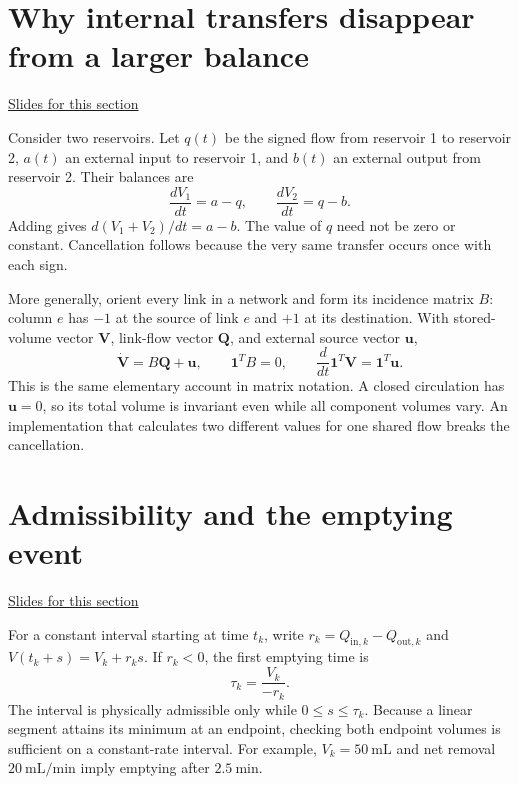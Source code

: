 \documentclass[11pt,letterpaper]{article}
\theoremstyle{definition}\newtheorem{definition}{Definition}\newtheorem{example}{Example}
\numberwithin{equation}{section}
\begin{document}
\section{Why internal transfers disappear from a larger balance}
\hypertarget{note-why-internal-transfers-disappear-from-a-larger-balance}{}\label{note:why-internal-transfers-disappear-from-a-larger-balance}
{\small \href{slides.html\#frame=enlarge-the-boundary\&step=1}{Slides for this section}}\par
Consider two reservoirs. Let $q(t)$ be the signed flow from reservoir 1 to reservoir 2, $a(t)$ an external input to reservoir 1, and $b(t)$ an external output from reservoir 2. Their balances are
\[
\frac{dV_1}{dt}=a-q,\qquad \frac{dV_2}{dt}=q-b.
\]
Adding gives $d(V_1+V_2)/dt=a-b$. The value of $q$ need not be zero or constant. Cancellation follows because the very same transfer occurs once with each sign.

More generally, orient every link in a network and form its incidence matrix $B$: column $e$ has $-1$ at the source of link $e$ and $+1$ at its destination. With stored-volume vector $\mathbf V$, link-flow vector $\mathbf Q$, and external source vector $\mathbf u$,
\[
\dot{\mathbf V}=B\mathbf Q+\mathbf u,
\qquad \mathbf1^{T}B=0,
\qquad
\frac{d}{dt}\mathbf1^{T}\mathbf V=\mathbf1^{T}\mathbf u.
\]
This is the same elementary account in matrix notation. A closed circulation has $\mathbf u=0$, so its total volume is invariant even while all component volumes vary. An implementation that calculates two different values for one shared flow breaks the cancellation.
\section{Admissibility and the emptying event}
\hypertarget{note-admissibility-and-the-emptying-event}{}\label{note:admissibility-and-the-emptying-event}
{\small \href{slides.html\#frame=locate-the-first-impossible-continuation\&step=1}{Slides for this section}}\par
For a constant interval starting at time $t_k$, write $r_k=Q_{\mathrm{in},k}-Q_{\mathrm{out},k}$ and $V(t_k+s)=V_k+r_ks$. If $r_k<0$, the first emptying time is
\[
\tau_k=\frac{V_k}{-r_k}.
\]
The interval is physically admissible only while $0\leq s\leq\tau_k$. Because a linear segment attains its minimum at an endpoint, checking both endpoint volumes is sufficient on a constant-rate interval. For example, $V_k=50\ \mathrm{mL}$ and net removal $20\ \mathrm{mL}/\mathrm{min}$ imply emptying after $2.5\ \mathrm{min}$.
\end{document}
